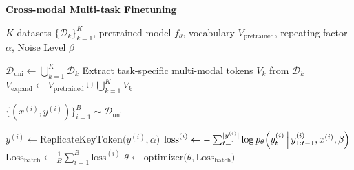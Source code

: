 \begin{algorithm}[t!] \small
\caption{\textbf{Cross-modal Multi-task Finetuning}}
\begin{algorithmic}[1]
\REQUIRE $K$ datasets $\{\mathcal{D}_k\}_{k=1}^K$, 
         pretrained model $f_\theta$, 
         vocabulary $V_\text{pretrained}$, repeating factor $\alpha$, Noise Level $\beta$

\STATE $\mathcal{D}_\text{uni} \gets \bigcup_{k=1}^K \mathcal{D}_k$
\STATE Extract task-specific multi-modal tokens $V_k$ from $\mathcal{D}_k$
\STATE $V_\text{expand} \gets V_\text{pretrained} \cup \bigcup_{k=1}^K V_k$

\REPEAT
    \STATE $\{(x^{(i)}, y^{(i)})\}_{i=1}^B \sim \mathcal{D}_\text{uni}$ 
    
        \STATE $y^{(i)} \gets \text{ReplicateKeyToken}\bigl(y^{(i)},\alpha \bigr)$ 
        \STATE $\text{loss}^{(i)} \gets -\sum_{t=1}^{|y^{(i)}|} 
            \log p_\theta\Bigl(y^{(i)}_t \,\Big\vert\, y^{(i)}_{1:t-1},x^{(i)} ,\beta\Bigr)$
    \ENDFOR
    \STATE $\text{Loss}_\text{batch} \gets \frac{1}{B}\sum_{i=1}^{B} \text{loss}^{(i)}$
    \STATE $\theta \gets \text{optimizer}\bigl(\theta, \text{Loss}_\text{batch}\bigr)$ 

\label{algorithm:1}
\end{algorithmic}
\end{algorithm}



